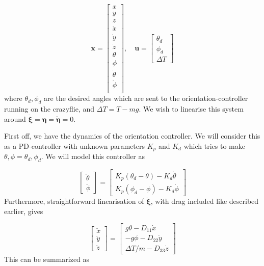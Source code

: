 \documentclass{article}
\begin{document}
\begin{equation}
\label{eq:MPCstates}
\mathbf{x} = \begin{bmatrix}
x\\
y\\
z\\
\dot{x}\\
\dot{y}\\
\dot{z}\\
\theta\\
\phi\\
\dot{\theta}\\
\dot{\phi}\\
\end{bmatrix}, \quad
\mathbf{u} = \begin{bmatrix}
\theta_d\\
\phi_d\\
\Delta T
\end{bmatrix}
\end{equation}
where $\theta_d, \phi_d$ are the desired angles which are sent to the orientation-controller running on the crazyflie, and $\Delta T = T - m g$. We wish to linearise this system around $\dot{\mathbf{\xi}} = \mathbf{\eta} = \dot{\mathbf{\eta}} = 0$. 

First off, we have the dynamics of the orientation controller. We will consider this as a PD-controller with unknown parameters $K_p$ and $K_d$ which tries to make $\theta, \phi = \theta_d, \phi_d$. We will model this controller as

\begin{equation}
\label{eq:innerPDdynamics}
\begin{bmatrix}
\ddot{\theta}\\
\ddot{\phi}
\end{bmatrix} = \begin{bmatrix}
K_p(\theta_d - \theta) - K_d \dot{\theta}\\
K_p(\phi_d - \phi) - K_d \dot{\phi}
\end{bmatrix}
\end{equation}
Furthermore, straightforward linearisation of $\ddot{\mathbf{\xi}}$, with drag included like described earlier, gives

\begin{equation}
\label{eq:xilin}
\begin{bmatrix}
\ddot{x}\\
\ddot{y}\\
\ddot{z}
\end{bmatrix} = \begin{bmatrix}
g \theta - D_{11} \dot{x} \\
-g \phi - D_{22} \dot{y}\\
\Delta T / m - D_{33} \dot{z}
\end{bmatrix}
\end{equation}
This can be summarized as 
\end{document}
